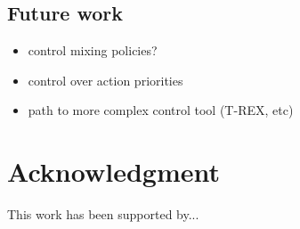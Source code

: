 \documentclass[a4paper, 10pt, conference]{ieeeconf}      %
\begin{document}
\subsection{Future work}

\begin{itemize}
    \item control mixing policies?
    \item control over action priorities
    \item path to more complex control tool (T-REX, etc)
\end{itemize}

\section*{Acknowledgment}

This work has been supported by...



\end{document}
